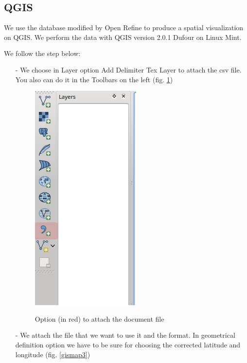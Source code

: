\documentclass[10pt,a4paper]{article}
\begin{document}
\subsection{QGIS}

We use the database modified by Open Refine to produce a spatial visualization on QGIS. We perform the data with QGIS version 2.0.1 Dufour on Linux Mint. 

We follow the step below:
\begin{itemize}
\item[-] We choose in Layer option Add Delimiter Tex Layer to attach the csv file. You also can do it in the Toolbars on the left (fig. \ref{gismap2})
\begin{figure}[hdp]
\centering
\includegraphics[scale=0.50]{gismap2.png}
\label{gismap2}
\caption{Option (in red) to attach the document file}
\end{figure}
\item[-] We attach the file that we want to use it and the format. In geometrical definition option we have to be sure for choosing the corrected latitude and longitude (fig. \ref{gismap3})


\end{itemize}
\end{document}
